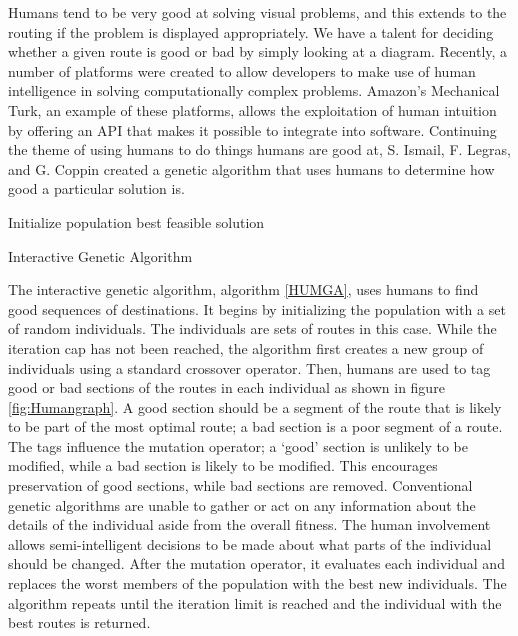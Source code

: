 \documentclass{sig-alternate}
\begin{document}
Humans tend to be very good at solving visual problems, and this extends to the routing if the problem is displayed appropriately. We have a talent for deciding whether a given route is good or bad by simply looking at a diagram. Recently, a number of platforms were created to allow developers to make use of human intelligence in solving computationally complex problems. Amazon's Mechanical Turk, an example of these platforms, allows the exploitation of human intuition by offering an API that makes it possible to integrate into software. 
	Continuing the theme of using humans to do things humans are good at, S. Ismail, F. Legras, and G. Coppin \cite{Ismail:2012} created a genetic algorithm that uses humans to determine how good a particular solution is. 


\begin{algorithm}
Initialize population\;
\Return best feasible solution\;
\caption{Interactive Genetic Algorithm\label{HUMGA}}
\end{algorithm}

The interactive genetic algorithm, algorithm \ref{HUMGA}, uses humans to find good sequences of destinations. It begins by initializing the population with a set of random individuals. The individuals are sets of routes in this case. While the iteration cap has not been reached, the algorithm first creates a new group of individuals using a standard crossover operator. Then, humans are used to tag good or bad sections of the routes in each individual as shown in figure \ref{fig:Humangraph}. A good section should be a segment of the route that is likely to be part of the most optimal route; a bad section is a poor segment of a route. The tags influence the mutation operator; a `good' section is unlikely to be modified, while a bad section is likely to be modified. This encourages preservation of good sections, while bad sections are removed. Conventional genetic algorithms are unable to gather or act on any information about the details of the individual aside from the overall fitness. The human involvement allows semi-intelligent decisions to be made about what parts of the individual should be changed. After the mutation operator, it evaluates each individual and replaces the worst members of the population with the best new individuals. The algorithm repeats until the iteration limit is reached and the individual with the best routes is returned. 
\end{document}
